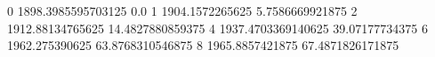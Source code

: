 0 1898.3985595703125 0.0
1 1904.1572265625 5.7586669921875
2 1912.88134765625 14.4827880859375
4 1937.4703369140625 39.07177734375
6 1962.275390625 63.8768310546875
8 1965.8857421875 67.4871826171875
